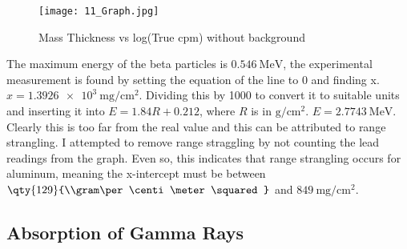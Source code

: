 \documentclass[11pt]{article}
\begin{document}
	\begin{figure}[htbp]
		\centering
		\texttt{[image: 11\_Graph.jpg]}
		\caption{\centering Mass Thickness vs log(True cpm) without background}
		\label{fig:11_Graph}
	\end{figure}
	
	The maximum energy of the beta particles is $\qty{0.546}{\unit{\mega\electronvolt}}$, the experimental measurement is found by setting the equation of the line to 0 and finding x. $x = \qty{1.3926e3}{\milli\gram\per\centi\meter\squared}$. Dividing this by 1000 to convert it to suitable units and inserting it into $E = 1.84R+0.212$, where $R$ is in $\unit{\gram\per\centi\meter\squared}$. $E = \qty{2.7743}{\mega\electronvolt}$. Clearly this is too far from the real value and this can be attributed to range strangling. I attempted to remove range straggling by not counting the lead readings from the graph. Even so, this indicates that range strangling occurs for aluminum, meaning the x-intercept must be between $\qty{129}{\\gram\per\centi\meter\squared}$ and $\qty{849}{\milli\gram\per\centi\meter\squared}$.
	
	
\clearpage

	\subsection{Absorption of Gamma Rays}
	
\end{document}
